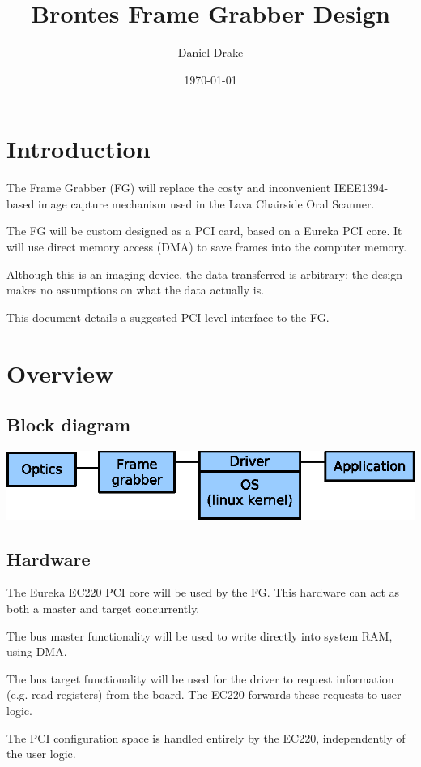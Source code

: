 \documentclass[12pt]{article}
\title{Brontes Frame Grabber Design}
\author{Daniel Drake}
\date{\today}
\begin{document}
\maketitle

\section{Introduction}

The Frame Grabber (FG) will replace the costy and inconvenient IEEE1394-based image capture mechanism used in the Lava Chairside Oral Scanner.

The FG will be custom designed as a PCI card, based on a Eureka PCI core. It will use direct memory access (DMA) to save frames into the computer memory.

Although this is an imaging device, the data transferred is arbitrary: the design makes no assumptions on what the data actually is.

This document details a suggested PCI-level interface to the FG.

\section{Overview}

\subsection{Block diagram}

\includegraphics{block.eps}

\subsection{Hardware}

The Eureka EC220 PCI core will be used by the FG. This hardware can act as both a master and target concurrently.

The bus master functionality will be used to write directly into system RAM, using DMA.

The bus target functionality will be used for the driver to request information (e.g. read registers) from the board. The EC220 forwards these requests to user logic.

The PCI configuration space is handled entirely by the EC220, independently of the user logic.
\end{document}

